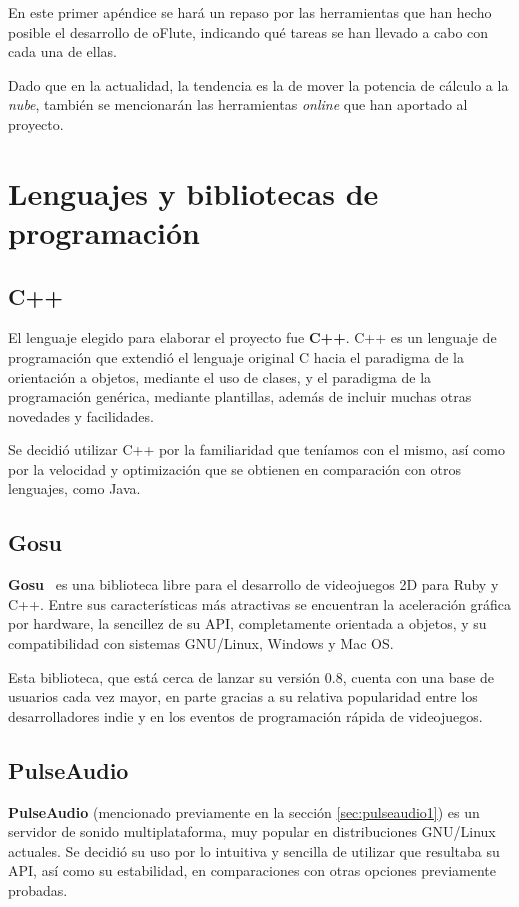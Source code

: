 En este primer apéndice se hará un repaso por las herramientas que han hecho
posible el desarrollo de oFlute, indicando qué tareas se han llevado a cabo con
cada una de ellas.

Dado que en la actualidad, la tendencia es la de mover la potencia de cálculo a
la \textit{nube}, también se mencionarán las herramientas \textit{online} que
han aportado al proyecto.

\section{Lenguajes y bibliotecas de programación}

\subsection{C++}
El lenguaje elegido para elaborar el proyecto fue \textbf{C++}. C++ es un
lenguaje de programación que extendió el lenguaje original C hacia el paradigma
de la orientación a objetos, mediante el uso de clases, y el paradigma de la
programación genérica, mediante plantillas, además de incluir muchas otras
novedades y facilidades.

Se decidió utilizar C++ por la familiaridad que teníamos con el mismo, así como
por la velocidad y optimización que se obtienen en comparación con otros
lenguajes, como Java.

\subsection{Gosu}
\textbf{Gosu}~\cite{gosu} es una biblioteca libre para el desarrollo de
videojuegos 2D para Ruby y C++. Entre sus características más atractivas se
encuentran la aceleración gráfica por hardware, la sencillez de su API,
completamente orientada a objetos, y su compatibilidad con sistemas GNU/Linux,
Windows y Mac OS.

Esta biblioteca, que está cerca de lanzar su versión 0.8, cuenta con una base de
usuarios cada vez mayor, en parte gracias a su relativa popularidad entre los
desarrolladores indie y en los eventos de programación rápida de videojuegos.

\subsection{PulseAudio}
\textbf{PulseAudio} (mencionado previamente en la sección \ref{sec:pulseaudio1})
es un servidor de sonido multiplataforma, muy popular en distribuciones
GNU/Linux actuales. Se decidió su uso por lo intuitiva y sencilla de utilizar
que resultaba su API, así como su estabilidad, en comparaciones con otras
opciones previamente probadas.

